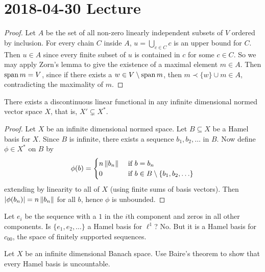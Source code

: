 \section{2018-04-30 Lecture}

\begin{proof}
  Let $A$ be the set of all non-zero linearly independent subsets of $V$ ordered by inclusion.
  For every chain $C$ inside $A$, $u = \bigcup_{c \in C} c$ is an upper bound for $C$.
  Then $u \in A$ since every finite subset of $u$ is contained in $c$ for some $c \in C$.
  So we may apply Zorn's lemma to give the existence of a maximal element $m \in A$.
  Then $\operatorname{span} m = V$, since if there exists a $w \in V \setminus \operatorname{span} m$, then $m \prec \{w\} \cup m \in A$, contradicting the maximality of $m$.
\end{proof}

\begin{prop}
  There exists a discontinuous linear functional in any infinite dimensional normed vector space $X$, that is, $X' \subsetneq X^*$.
\end{prop}

\begin{proof}
  Let $X$ be an infinite dimensional normed space.
  Let $B \subseteq X$ be a Hamel basis for $X$.
  Since $B$ is infinite, there exists a sequence $b_1,b_2,\ldots$ in $B$.
  Now define $\phi \in X^*$ on $B$ by
  \begin{equation*}
    \phi(b)=
    \begin{cases}
      n\left\lVert b_n \right\rVert & \text{ if } b=b_n \\
      0 & \text{ if } b \in B \setminus\{b_1,b_2,\ldots\}
    \end{cases}
  \end{equation*}
  extending by linearity to all of $X$ (using finite sums of basis vectors).
  Then $\left\lvert \phi(b_n) \right\rvert = n\left\lVert b_n \right\rVert$ for all $b$, hence $\phi$ is unbounded.
\end{proof}

\begin{rmk}
  Let $e_i$ be the sequence with a $1$ in the $i$th component and zeros in all other components.
  Is $\{e_1,e_2,\ldots\}$ a Hamel basis for $\ell^1$?
  No.
  But it is a Hamel basis for $c_{00}$, the space of finitely supported sequences.
\end{rmk}

\begin{exer}
  Let $X$ be an infinite dimensional Banach space.
  Use Baire's theorem to show that every Hamel basis is uncountable.
\end{exer}

